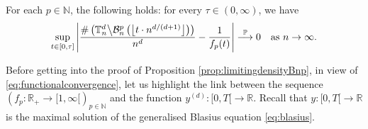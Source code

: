 \documentclass[a4paper,11pt]{article}
\begin{document}
\begin{prop}\label{prop:limitingdensityBnp}
For each $p\in\mathbb{N}$, the following holds: for every $\tau\in(0,\infty)$, we have
\begin{equation}\label{eq:functionalconvergencep}
\sup_{t\in[0,\tau]}\left|\frac{\#\left(\mathbb{T}_n^d\middle\backslash\mathcal{B}_n^p\left(\left\lfloor t\cdot n^{d/(d+1)}\right\rfloor\right)\right)}{n^d}-\frac{1}{f_p(t)}\right|\overset{\mathbb{P}}{\longrightarrow}0\quad\text{as $n\to\infty$.}
\end{equation}
\end{prop}

Before getting into the proof of Proposition \ref{prop:limitingdensityBnp}, in view of \eqref{eq:functionalconvergence}, let us highlight the link between the sequence $(f_p:\mathbb{R}_+\rightarrow[1,\infty[)_{p\in\mathbb{N}}$ and the function $y^{(d)}:{[0,T[}\rightarrow\mathbb{R}$.
Recall that $y:{[0,T[}\rightarrow\mathbb{R}$ is the maximal solution of the generalised Blasius equation \eqref{eq:blasius}.
\end{document}
